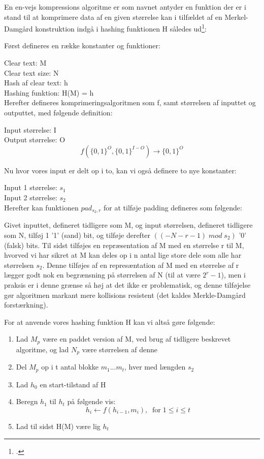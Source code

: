 \documentclass[a4paper, 8pt, oneside]{article} %
\begin{document}
En en-vejs kompressions algoritme er som navnet antyder en funktion der er i stand til at komprimere data af en given størrelse kan i tilfældet af en Merkel-Damgård konstruktion indgå i hashing funktionen H således ud\footcite{thomsen_cryptographic_nodate}:

Først defineres en række konstanter og funktioner:

Clear text: M\\
Clear text size: N\\
Hash af clear text: h\\
Hashing funktion: H(M) = h\\

Herefter defineres komprimeringsalgoritmen som f, samt størrelsen af inputtet og outputtet, med følgende definition:

Input størrelse: I\\
Output størrelse: O\\

\[f\left(\{0,1\}^O, \{0,1\}^{I-O}\right) \rightarrow \{0,1\}^O\]

Nu hvor vores input er delt op i to, kan vi også definere to nye konstanter:

Input 1 størrelse: $s_1$\\
Input 2 størrelse: $s_2$\\

Herefter kan funktionen $pad_{s_2, r}$ for at tilføje padding defineres som følgende:

Givet inputtet, defineret tidligere som M, og input størrelsen, defineret tidligere som N, tilføj 1 '1' (sand) bit, og tilføje derefter $((- N - r - 1) \; mod\; s_2 )$ '0' (falsk) bits. Til sidst tilføjes en repræsentation af M med en størrelse r til M, hvorved vi har sikret at M kan deles op i n antal lige store dele som alle har størrelsen $s_2$. Denne tilføjes af en represæntation af M med en størrelse af r lægger godt nok en begrænsning på størrelsen af N (til at være $2^r - 1$), men i praksis er i denne grænse så høj at det ikke er problematisk, og denne tilføjelse gør algoritmen markant mere kollisions resistent (det kaldes Merkle-Damgård forstærkning).

For at anvende vores hashing funktion H kan vi altså gøre følgende:

\begin{enumerate}
	\item Lad $M_p$ være en paddet version af M, ved brug af tidligere beskrevet algoritme, og lad $N_p$ være størrelsen af denne
	\item Del $M_p$ op i t antal blokke $m_1 ... m_t$, hver med længden $s_2$
	\item Lad $h_0$ en start-tilstand af H
	\item Beregn $h_1$ til $h_t$ på følgende vis:
		\[h_i \leftarrow f(h_{i - 1}, m_i), \;\; \textrm{for} \; 1 \leq i \leq t\]
	\item Lad til sidst H(M) være lig $h_t$
\end{enumerate}
\end{document}
